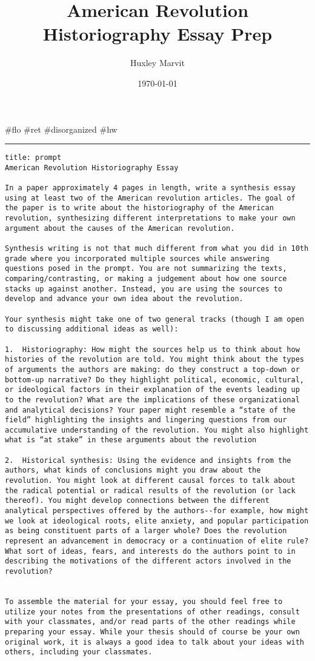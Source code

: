 \documentclass[letterpaper]{article}
\author{Huxley Marvit}
\date{\today}
\title{American Revolution Historiography Essay Prep}
\renewcommand{\tableofcontents}{}
\begin{document}
\tableofcontents

\#flo \#ret \#disorganized \#hw

\noindent\rule{\textwidth}{0.5pt}

\begin{verbatim}
title: prompt
American Revolution Historiography Essay

In a paper approximately 4 pages in length, write a synthesis essay using at least two of the American revolution articles. The goal of the paper is to write about the historiography of the American revolution, synthesizing different interpretations to make your own argument about the causes of the American revolution. 

Synthesis writing is not that much different from what you did in 10th grade where you incorporated multiple sources while answering questions posed in the prompt. You are not summarizing the texts, comparing/contrasting, or making a judgement about how one source stacks up against another. Instead, you are using the sources to develop and advance your own idea about the revolution. 

Your synthesis might take one of two general tracks (though I am open to discussing additional ideas as well):

1.  Historiography: How might the sources help us to think about how histories of the revolution are told. You might think about the types of arguments the authors are making: do they construct a top-down or bottom-up narrative? Do they highlight political, economic, cultural, or ideological factors in their explanation of the events leading up to the revolution? What are the implications of these organizational and analytical decisions? Your paper might resemble a “state of the field” highlighting the insights and lingering questions from our accumulative understanding of the revolution. You might also highlight what is “at stake” in these arguments about the revolution

2.  Historical synthesis: Using the evidence and insights from the authors, what kinds of conclusions might you draw about the revolution. You might look at different causal forces to talk about the radical potential or radical results of the revolution (or lack thereof). You might develop connections between the different analytical perspectives offered by the authors--for example, how might we look at ideological roots, elite anxiety, and popular participation as being constituent parts of a larger whole? Does the revolution represent an advancement in democracy or a continuation of elite rule? What sort of ideas, fears, and interests do the authors point to in describing the motivations of the different actors involved in the revolution?


To assemble the material for your essay, you should feel free to utilize your notes from the presentations of other readings, consult with your classmates, and/or read parts of the other readings while preparing your essay. While your thesis should of course be your own original work, it is always a good idea to talk about your ideas with others, including your classmates.
\end{verbatim}
\end{document}
